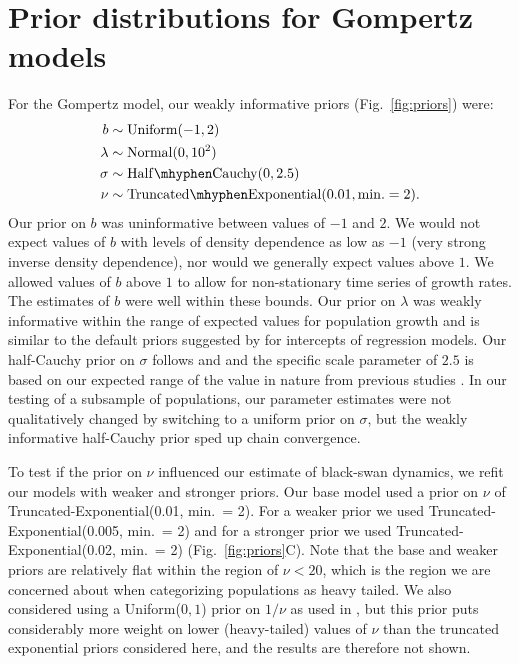 \documentclass[12pt]{article}
\begin{document}
\section{Prior distributions for Gompertz models}

For the Gompertz model, our weakly informative priors (Fig.~\ref{fig:priors}) were:
\begin{align}
b &\sim \mathrm{Uniform}(-1, 2)\\
\lambda &\sim \mathrm{Normal}(0, 10^2)\\
\sigma &\sim \mathrm{Half\mhyphen Cauchy} (0, 2.5)\\
\nu &\sim \mathrm{Truncated\mhyphen Exponential}(0.01, \mathrm{min.} = 2).
\end{align}
Our prior on \(b\) was uninformative between values of \(-1\) and \(2\). We
would not expect values of \(b\) with levels of density dependence as low as
\(-1\) (very strong inverse density dependence), nor would we generally expect
values above \(1\). We allowed values of \(b\) above \(1\) to allow for
non-stationary time series of growth rates. The estimates of \(b\) were well
within these bounds. Our prior on \(\lambda\) was weakly informative within the
range of expected values for population growth and is similar to the default
priors suggested by \citet{gelman2008d} for intercepts of
regression models. Our half-Cauchy prior on \(\sigma\) follows
\citet{gelman2006c} and \citet{gelman2008d} and the specific scale parameter of
\(2.5\) is based on our expected range of the value in nature from previous
studies \citep{connors2014}. In our testing of a subsample of populations, our
parameter estimates were not qualitatively changed by switching to a uniform
prior on \(\sigma\), but the weakly informative half-Cauchy prior sped up chain
convergence.

To test if the prior on \(\nu\) influenced our estimate of black-swan dynamics,
we refit our models with weaker and stronger priors. Our base model used a
prior on \(\nu\) of Truncated-Exponential(0.01, min.\ = 2). For a weaker prior
we used Truncated-Exponential(0.005, min.\ = 2) and for a stronger prior we
used Truncated-Exponential(0.02, min.\ = 2) (Fig.~\ref{fig:priors}C). Note that
the base and weaker priors are relatively flat within the region of \(\nu <
20\), which is the region we are concerned about when categorizing
populations as heavy tailed. We also considered using a Uniform(\(0, 1\))
prior on \(1/\nu\) as used in \citet{gelman2014}, but this
prior puts considerably more weight on lower (heavy-tailed) values of \(\nu\)
than the truncated exponential priors considered here,
and the results are therefore not shown.
\end{document}
